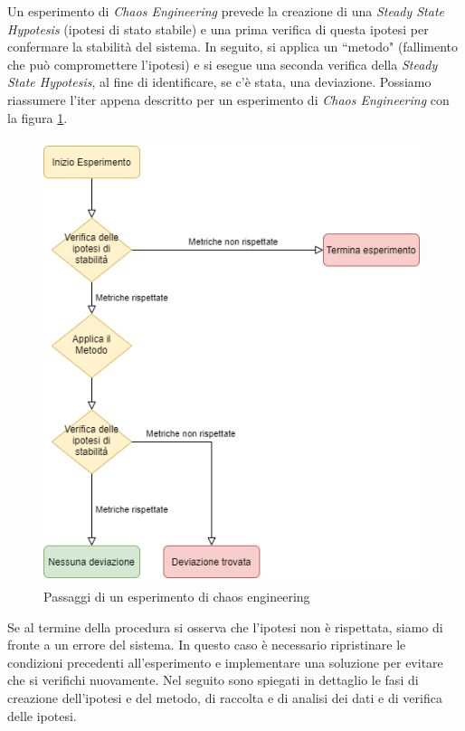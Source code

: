         Un esperimento di \textit{Chaos Engineering} prevede la creazione di una \textit{Steady State Hypotesis} (ipotesi di stato stabile) e una prima verifica di questa ipotesi per confermare la stabilità del sistema. In seguito, si applica un ``metodo" (fallimento che può compromettere l'ipotesi) e si esegue una seconda verifica della \textit{Steady State Hypotesis}, al fine di identificare, se c'è stata, una deviazione. Possiamo riassumere l'iter appena descritto per un esperimento di \textit{Chaos Engineering} con la figura \ref{fig:5-6miles}.
        \begin {figure}
        \begin{center}
            \includegraphics[width=11cm, height=13cm]{images/56miles.png}
            \caption {Passaggi di un esperimento di chaos engineering}
            \label{fig:5-6miles}
        \end{center}
        \end {figure}
        Se al termine della procedura si osserva che l'ipotesi non è rispettata, siamo di fronte a un errore del sistema. In questo caso è necessario ripristinare le condizioni precedenti all'esperimento e implementare una soluzione per evitare che si verifichi nuovamente.
        Nel seguito sono spiegati in dettaglio le fasi di creazione dell'ipotesi e del metodo, di raccolta e di analisi dei dati e di verifica delle ipotesi.
